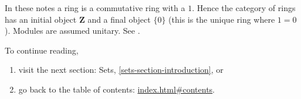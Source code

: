 \documentclass{amsart}
\theoremstyle{definition}
\theoremstyle{remark}
\numberwithin{equation}{subsection}
\begin{document}
\noindent
In these notes a ring is a commutative ring with a $1$. Hence the
category of rings has an initial object $\mathbf{Z}$ and a final
object $\{0\}$ (this is the unique ring where $1=0$). Modules are 
assumed unitary. See \cite{E}.

\smallskip\noindent
To continue reading, 
\begin{enumerate}

\item visit the next section: Sets,
\autoref{sets-section-introduction}, or 

\item go back to the
table of contents: \url{index.html#contents}.

\end{enumerate}



\end{document}
